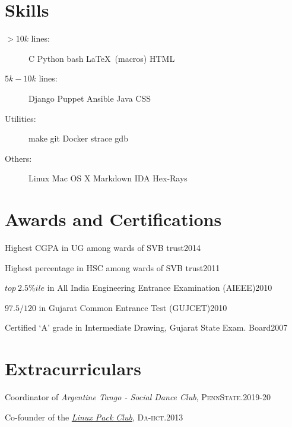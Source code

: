 \documentclass[margin]{res}
\newcommand{\daiict}{\textsc{Da-iict}}
\newcommand{\psu}{\textsc{PennState}}
\begin{document}
\begin{resume}
\section{Skills}
\begin{description}
    \item[$>10k$ lines:]
        C \textbullet{}
        Python \textbullet{}
        bash \textbullet{}
        \LaTeX\ (macros) \textbullet{}
        HTML

    \item[$5k-10k$ lines:]
        Django \textbullet{}
        Puppet \textbullet{}
        Ansible \textbullet{}
        Java \textbullet{}
        CSS

    \item[Utilities:]
        make \textbullet{}
        git \textbullet{}
        Docker \textbullet{}
        strace \textbullet{}
        gdb

    \item[Others:]
        Linux \textbullet{}
        Mac OS X \textbullet{}
        Markdown \textbullet{}
        IDA Hex-Rays
\end{description}

\section{Awards and Certifications}
\begin{itemizemisc}
\item Highest CGPA in UG among wards of SVB trust\hfill 2014
\item Highest percentage in HSC among wards of SVB trust\hfill 2011
\item $top\ 2.5\%ile$ in All India Engineering Entrance Examination (AIEEE)\hfill 2010
\item $97.5 / 120$ in Gujarat Common Entrance Test (GUJCET)\hfill 2010
\item Certified `A' grade in Intermediate Drawing, Gujarat State Exam. Board\hfill 2007
\end{itemizemisc}

\section{Extracurriculars}
\begin{itemizemisc}
\item Coordinator of \emph{Argentine Tango - Social Dance Club}, \psu.\hfill 2019-20 %
\item Co-founder of the \href{http://lpdaiict.wordpress.com/}{\itshape Linux Pack Club}, \daiict.\hfill 2013
\end{itemizemisc}


\end{resume}
\end{document}
